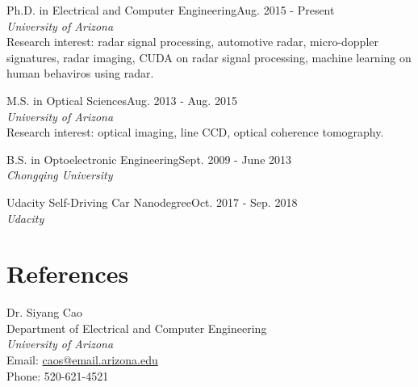 \documentclass[letterpaper,9pt]{article}
\renewenvironment{itemize}{
  \begin{list}{}{
    \setlength{\topsep}{0pt}
    \setlength{\itemsep}{0pt}
    \setlength{\parsep}{0pt}
    \setlength{\partopsep}{0pt}
    \setlength{\leftmargin}{1.5em}
  }
}{\end{list}}
\begin{document}
\begin{itemize}
  \setlength{\itemsep}{1em}
  \item Ph.D. in Electrical and Computer Engineering\hfill Aug. 2015 - Present\\ {\it University of Arizona}\\Research interest: radar signal processing, automotive radar, micro-doppler signatures, radar imaging, CUDA on radar signal processing, machine learning on human behaviros using radar.
  \item M.S. in Optical Sciences\hfill Aug. 2013 - Aug. 2015\\ {\it University of Arizona}\\Research interest: optical imaging, line CCD, optical coherence tomography.
  \item B.S. in Optoelectronic Engineering\hfill Sept. 2009 - June 2013\\ {\it Chongqing University}
  \item Udacity Self-Driving Car Nanodegree\hfill Oct. 2017 - Sep. 2018\\ {\it Udacity}
\end{itemize}


\section*{References}
\begin{itemize}
\item Dr. Siyang Cao\\
Department of Electrical and Computer Engineering\\
{\it University of Arizona}\\
Email: \href{mailto:caos@email.arizona.edu}{caos@email.arizona.edu}\\
Phone: 520-621-4521
\end{itemize}

\bigskip
\end{document}
